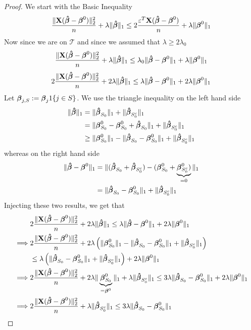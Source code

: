 \begin{proof}
    We start with the Basic Inequality
    \[
        \frac{\| \mathbf{X} (\boldsymbol{\hat{\beta}}-\boldsymbol{\beta}^{0})\|_{2}^{2}}{n} + \lambda\|\boldsymbol{\hat{\beta}}\|_{1} \leq 2 \frac{\varepsilon^{T} \mathbf{X} (\boldsymbol{\hat{\beta}}-\boldsymbol{\beta}^{0})}{n}+\lambda\|\boldsymbol{\beta}^{0}\|_{1}
    \]
    Now since we are on $\mathscr{T}$ and since we assumed that \( \lambda \geq 2 \lambda_0 \)
    \[
        \frac{\| \mathbf{X} (\boldsymbol{\hat{\beta}}-\boldsymbol{\beta}^{0})\|_{2}^{2}}{n} + \lambda\|\boldsymbol{\hat{\beta}}\|_{1} \leq \lambda_0 \|\boldsymbol{\hat{\beta}}-\boldsymbol{\beta}^{0}\|_1 + \lambda\|\boldsymbol{\beta}^{0}\|_{1}
    \]
    \[
        2 \frac{\| \mathbf{X} (\boldsymbol{\hat{\beta}}-\boldsymbol{\beta}^{0})\|_{2}^{2}}{n}+2 \lambda\|\boldsymbol{\hat{\beta}}\|_{1} \leq \lambda \|\boldsymbol{\hat{\beta}}-\boldsymbol{\beta}^{0} \|_{1}+2 \lambda \|\boldsymbol{\beta}^{0} \|_{1}
    \]
    Let $\boldsymbol{\beta}_{j, S}:=\boldsymbol{\beta}_{j} 1\{j \in S\}$. We use the triangle inequality on the left hand side
    \begin{align*}
        \|\boldsymbol{\hat{\beta}}\|_{1}
         & = \|\boldsymbol{\hat{\beta}}_{S_{0}} \|_{1} + \|\boldsymbol{\hat{\beta}}_{S_{0}^{c}} \|_{1}                                                \\
         & = \|\boldsymbol{\beta}_{S_{0}}^{0} - \boldsymbol{\beta}_{S_{0}}^{0} + \boldsymbol{\hat{\beta}}_{S_{0}} \|_{1} + \|\boldsymbol{\hat{\beta}}_{S_{0}^{c}} \|_{1}          \\
         & \geq \|\boldsymbol{\beta}_{S_{0}}^{0} \|_{1} - \|\boldsymbol{\hat{\beta}}_{S_{0}}-\boldsymbol{\beta}_{S_{0}}^{0} \|_{1}+ \|\boldsymbol{\hat{\beta}}_{S_{0}^{c}} \|_{1}
    \end{align*}
    whereas on the right hand side
    \begin{align*}
        \|\boldsymbol{\hat{\beta}}-\boldsymbol{\beta}^{0} \|_{1}
         & =  \| (\boldsymbol{\hat{\beta}}_{S_{0}} + \boldsymbol{\hat{\beta}}_{S_{0}^{c}}) - (\boldsymbol{\beta}_{S_{0}}^{0} + \underbrace{\boldsymbol{\beta}_{S_{0}^{c}}^0)}_{=0} \|_{1} \\
         & =  \| \boldsymbol{\hat{\beta}}_{S_{0}}-\boldsymbol{\beta}_{S_{0}}^{0} \|_{1} + \|\boldsymbol{\hat{\beta}}_{S_{0}^{c}} \|_{1}
    \end{align*}
    Injecting these two results, we get that
    \begin{align*}
                 & 2 \frac{\| \mathbf{X} (\boldsymbol{\hat{\beta}}-\boldsymbol{\beta}^{0})\|_{2}^{2}}{n} + 2 \lambda\|\boldsymbol{\hat{\beta}}\|_{1} \leq \lambda \|\boldsymbol{\hat{\beta}}-\boldsymbol{\beta}^{0} \|_{1}+2 \lambda \|\boldsymbol{\beta}^{0} \|_{1}                                                                                                \\
        \implies & 2 \frac{\| \mathbf{X} (\boldsymbol{\hat{\beta}}-\boldsymbol{\beta}^{0})\|_{2}^{2}}{n} + 2 \lambda \left( \|\boldsymbol{\beta}_{S_{0}}^{0} \|_{1} - \|\boldsymbol{\hat{\beta}}_{S_{0}}-\boldsymbol{\beta}_{S_{0}}^{0} \|_{1}+ \|\boldsymbol{\hat{\beta}}_{S_{0}^{c}} \|_{1} \right)                                                               \\
                 & \leq \lambda \left( \| \boldsymbol{\hat{\beta}}_{S_{0}}-\boldsymbol{\beta}_{S_{0}}^{0} \|_{1} + \|\boldsymbol{\hat{\beta}}_{S_{0}^{c}} \|_{1} \right) + 2 \lambda \|\boldsymbol{\beta}^{0} \|_{1}                                                                                                         \\
        \implies & 2 \frac{\| \mathbf{X} (\boldsymbol{\hat{\beta}}-\boldsymbol{\beta}^{0})\|_{2}^{2}}{n} + 2 \lambda \|\underbrace{\boldsymbol{\beta}_{S_{0}}^{0}}_{= \boldsymbol{\beta}^0} \|_{1} + \lambda \|\boldsymbol{\hat{\beta}}_{S_{0}^{c}} \|_{1} \leq 3 \lambda \| \boldsymbol{\hat{\beta}}_{S_{0}}-\boldsymbol{\beta}_{S_{0}}^{0} \|_{1} + 2 \lambda \|\boldsymbol{\beta}^{0} \|_{1} \\
        \implies & 2\frac{ \|\mathbf{X} (\boldsymbol{\hat{\beta}}-\boldsymbol{\beta}^{0} ) \|_{2}^{2}}{n} + \lambda \|\boldsymbol{\hat{\beta}}_{S_{0}^{c}} \|_{1} \leq 3 \lambda \|\boldsymbol{\hat{\beta}}_{S_{0}}-\boldsymbol{\beta}_{S_{0}}^{0} \|_{1}
    \end{align*}
\end{proof}
